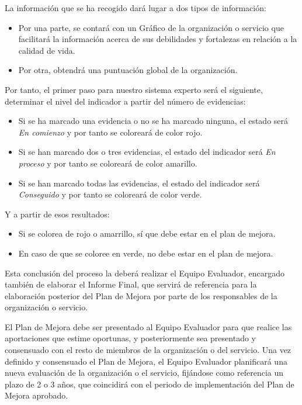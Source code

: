 La información que se ha recogido dará lugar a dos tipos de información: 
\begin{itemize}
	\item Por una parte, se contará con un Gráfico de la organización o servicio que facilitará la información acerca de sus debilidades y fortalezas en relación a la calidad de vida.
	\item Por otra, obtendrá una puntuación global de la organización. 
\end{itemize}

Por tanto, el primer paso para nuestro sistema experto será el siguiente, determinar el nivel del indicador a partir del número de evidencias:
\begin{itemize}
	\item Si se ha marcado una evidencia o no se ha marcado ninguna, el estado será \textit{En comienzo} y por tanto se coloreará de color rojo.
	\item Si se han marcado dos o tres evidencias, el estado del indicador será \textit{En proceso} y por tanto se coloreará de color amarillo.
	\item Si se han marcado todas las evidencias, el estado del indicador será \textit{Conseguido} y por tanto se coloreará de color verde.
\end{itemize}

Y a partir de esos resultados:
\begin{itemize}
	\item Si se colorea de rojo o amarrillo, sí que debe estar en el plan de mejora.
	\item En caso de que se coloree en verde, no debe estar en el plan de mejora.
\end{itemize}
 
Esta conclusión del proceso la deberá realizar el Equipo Evaluador, encargado
también de elaborar el Informe Final, que servirá de referencia
para la elaboración posterior del Plan de Mejora por parte de los
responsables de la organización o servicio.  
 
El Plan de Mejora debe ser presentado al Equipo Evaluador para que realice las
aportaciones que estime oportunas, y posteriormente sea presentado y consensuado
con el resto de miembros de la organización o del servicio. Una vez definido y
consensuado el Plan de Mejora, el Equipo Evaluador planificará una nueva
evaluación de la organización o el servicio, fijándose como referencia un plazo
de 2 o 3 años, que coincidirá con el periodo de implementación del Plan de
Mejora aprobado.





